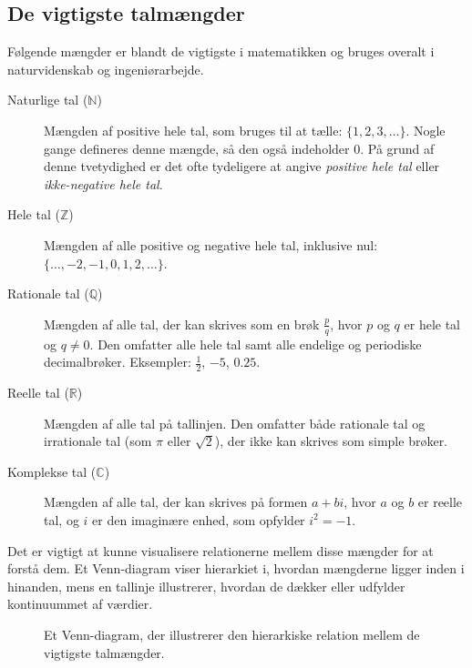 \subsection*{De vigtigste talmængder}
Følgende mængder er blandt de vigtigste i matematikken og bruges overalt i naturvidenskab og ingeniørarbejde.

\begin{description}
    \item[Naturlige tal ($\mathbb{N}$)] Mængden af positive hele tal, som bruges til at tælle: $\{1, 2, 3, \dots\}$. Nogle gange defineres denne mængde, så den også indeholder $0$. På grund af denne tvetydighed er det ofte tydeligere at angive \textit{positive hele tal} eller \textit{ikke-negative hele tal}.

    \item[Hele tal ($\mathbb{Z}$)] Mængden af alle positive og negative hele tal, inklusive nul: $\{\dots, -2, -1, 0, 1, 2, \dots\}$.

    \item[Rationale tal ($\mathbb{Q}$)] Mængden af alle tal, der kan skrives som en brøk $\frac{p}{q}$, hvor $p$ og $q$ er hele tal og $q \neq 0$. Den omfatter alle hele tal samt alle endelige og periodiske decimalbrøker. Eksempler: $\frac{1}{2}$, $-5$, $0.25$.

    \item[Reelle tal ($\mathbb{R}$)] Mængden af alle tal på tallinjen. Den omfatter både rationale tal og irrationale tal (som $\pi$ eller $\sqrt{2}$), der ikke kan skrives som simple brøker.
    
    \item[Komplekse tal ($\mathbb{C}$)] Mængden af alle tal, der kan skrives på formen $a + bi$, hvor $a$ og $b$ er reelle tal, og $i$ er den imaginære enhed, som opfylder $i^2 = -1$.
\end{description}

Det er vigtigt at kunne visualisere relationerne mellem disse mængder for at forstå dem. Et Venn-diagram viser hierarkiet i, hvordan mængderne ligger inden i hinanden, mens en tallinje illustrerer, hvordan de dækker eller udfylder kontinuummet af værdier.

\begin{figure}[htbp]
    \centering
    
    \caption{Et Venn-diagram, der illustrerer den hierarkiske relation mellem de vigtigste talmængder.}
    \label{fig:venn_num}
\end{figure}

